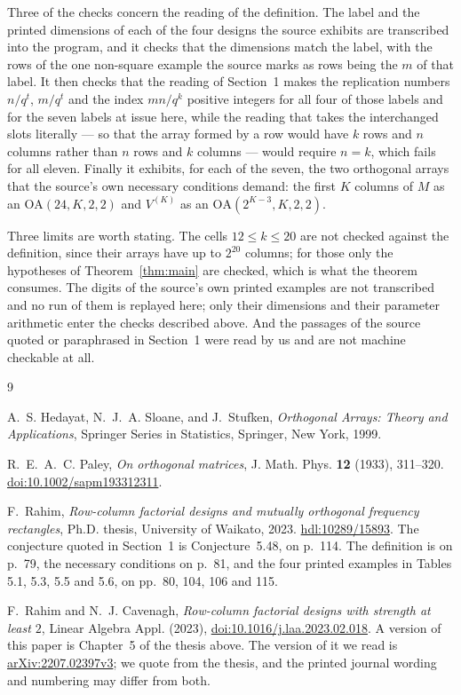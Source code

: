 \documentclass[11pt]{amsart}
\newcommand{\OA}{\mathrm{OA}}
\begin{document}
Three of the checks concern the reading of the definition. The label and the printed dimensions of
each of the four designs the source exhibits are transcribed into the program, and it checks that
the dimensions match the label, with the rows of the one non-square example the source marks as
rows being the $m$ of that label. It then checks that the reading of Section~1 makes the
replication numbers $n/q^t$, $m/q^t$ and the index $mn/q^k$ positive integers for all four of those
labels and for the seven labels at issue here, while the reading that takes the interchanged slots
literally --- so that the array formed by a row would have $k$ rows and $n$ columns rather than $n$
rows and $k$ columns --- would require $n=k$, which fails for all eleven. Finally it exhibits, for
each of the seven, the two orthogonal arrays that the source's own necessary conditions demand: the
first $K$ columns of $M$ as an $\OA(24,K,2,2)$ and $V^{(K)}$ as an $\OA(2^{K-3},K,2,2)$.

Three limits are worth stating. The cells $12\le k\le20$ are not checked against the definition,
since their arrays have up to $2^{20}$ columns; for those only the hypotheses of
Theorem~\ref{thm:main} are checked, which is what the theorem consumes. The digits of the source's
own printed examples are not transcribed and no run of them is replayed here; only their dimensions
and their parameter arithmetic enter the checks described above. And the passages of the source
quoted or paraphrased in Section~1 were read by us and are not machine checkable at all.

\begin{thebibliography}{9}

A.~S. Hedayat, N.~J.~A. Sloane, and J.~Stufken,
\emph{Orthogonal Arrays: Theory and Applications},
Springer Series in Statistics, Springer, New York, 1999.

R.~E.~A.~C. Paley,
\emph{On orthogonal matrices},
J. Math. Phys. \textbf{12} (1933), 311--320.
\href{https://doi.org/10.1002/sapm193312311}{doi:10.1002/sapm193312311}.

F.~Rahim,
\emph{Row-column factorial designs and mutually orthogonal frequency rectangles},
Ph.D. thesis, University of Waikato, 2023.
\href{https://hdl.handle.net/10289/15893}{hdl:10289/15893}.
The conjecture quoted in Section~1 is Conjecture~5.48, on p.~114. The definition is on p.~79, the
necessary conditions on p.~81, and the four printed examples in Tables 5.1, 5.3, 5.5 and 5.6, on
pp.~80, 104, 106 and 115.

F.~Rahim and N.~J. Cavenagh,
\emph{Row-column factorial designs with strength at least $2$},
Linear Algebra Appl. (2023),
\href{https://doi.org/10.1016/j.laa.2023.02.018}{doi:10.1016/j.laa.2023.02.018}.
A version of this paper is Chapter~5 of the thesis above. The version of it we read is
\href{https://arxiv.org/abs/2207.02397v3}{arXiv:2207.02397v3}; we quote from the thesis, and the
printed journal wording and numbering may differ from both.

\end{thebibliography}
\end{document}
